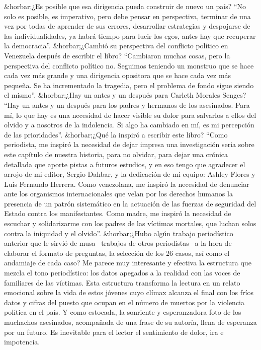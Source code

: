 \documentclass{article}%
\begin{document}
\newline%
%
\&horbar;¿Es posible que esa dirigencia pueda construir de nuevo un país?%
\newline%
%
“No solo es posible, es imperativo, pero debe pensar en perspectiva, terminar de una vez por todas de aprender de sus errores, desarrollar estrategias y despojarse de las individualidades, ya habrá tiempo para lucir los egos, antes hay que recuperar la democracia”.%
\newline%
%
\&horbar;¿Cambió su perspectiva del conflicto político en Venezuela después de escribir el libro?%
\newline%
%
“Cambiaron muchas cosas, pero la perspectiva del conflicto político no. Seguimos teniendo un monstruo que se hace cada vez más grande y una dirigencia opositora que se hace cada vez más pequeña. Se ha incrementado la tragedia, pero el problema de fondo sigue siendo el mismo”.%
\newline%
%
\&horbar;¿Hay un antes y un después para Carleth Morales Senges?%
\newline%
%
“Hay un antes y un después para los padres y hermanos de los asesinados. Para mí, lo que hay es una necesidad de hacer visible su dolor para salvarlos a ellos del olvido y a nosotros de la indolencia. Si algo ha cambiado en mí, es mi percepción de las prioridades”.%
\newline%
%
\&horbar;¿Qué la inspiró a escribir este libro?%
\newline%
%
“Como periodista, me inspiró la necesidad de dejar impresa una investigación seria sobre este capítulo de nuestra historia, para no olvidar, para dejar una crónica detallada que aporte pistas a futuros estudios, y en eso tengo que agradecer el arrojo de mi editor, Sergio Dahbar, y la dedicación de mi equipo: Ashley Flores y Luis Fernando Herrera. Como venezolana, me inspiró la necesidad de denunciar ante los organismos internacionales que velan por los derechos humanos la presencia de un patrón sistemático en la actuación de las fuerzas de seguridad del Estado contra los manifestantes. Como madre, me inspiró la necesidad de escuchar y solidarizarme con los padres de las víctimas mortales, que luchan solos contra la iniquidad y el olvido”.%
\newline%
%
\&horbar;¿Hubo algún trabajo periodístico anterior que le sirvió de musa –trabajos de otros periodistas– a la hora de elaborar el formato de preguntas, la selección de los 26 casos, así como el andamiaje de cada caso? Me parece muy interesante y efectiva la estructura que mezcla el tono periodístico: los datos apegados a la realidad con las voces de familiares de las víctimas. Esta estructura transforma la lectura en un relato emocional sobre la vida de estos jóvenes cuyo clímax alcanza el final con los fríos datos y cifras del puesto que ocupan en el número de muertos por la violencia política en el país. Y como estocada, la sonriente y esperanzadora foto de los muchachos asesinados, acompañada de una frase de su autoría, llena de esperanza por un futuro. Es inevitable para el lector el sentimiento de dolor, ira e impotencia.%
\end{document}
